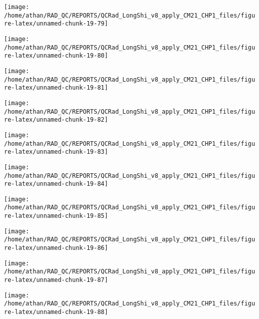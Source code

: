\documentclass[
  10pt,
  a4paper,oneside]{article}
\begin{document}
\begin{center}\texttt{[image: /home/athan/RAD\_QC/REPORTS/QCRad\_LongShi\_v8\_apply\_CM21\_CHP1\_files/figure-latex/unnamed-chunk-19-79]} \end{center}

\begin{center}\texttt{[image: /home/athan/RAD\_QC/REPORTS/QCRad\_LongShi\_v8\_apply\_CM21\_CHP1\_files/figure-latex/unnamed-chunk-19-80]} \end{center}

\begin{center}\texttt{[image: /home/athan/RAD\_QC/REPORTS/QCRad\_LongShi\_v8\_apply\_CM21\_CHP1\_files/figure-latex/unnamed-chunk-19-81]} \end{center}

\begin{center}\texttt{[image: /home/athan/RAD\_QC/REPORTS/QCRad\_LongShi\_v8\_apply\_CM21\_CHP1\_files/figure-latex/unnamed-chunk-19-82]} \end{center}

\begin{center}\texttt{[image: /home/athan/RAD\_QC/REPORTS/QCRad\_LongShi\_v8\_apply\_CM21\_CHP1\_files/figure-latex/unnamed-chunk-19-83]} \end{center}

\begin{center}\texttt{[image: /home/athan/RAD\_QC/REPORTS/QCRad\_LongShi\_v8\_apply\_CM21\_CHP1\_files/figure-latex/unnamed-chunk-19-84]} \end{center}

\begin{center}\texttt{[image: /home/athan/RAD\_QC/REPORTS/QCRad\_LongShi\_v8\_apply\_CM21\_CHP1\_files/figure-latex/unnamed-chunk-19-85]} \end{center}

\begin{center}\texttt{[image: /home/athan/RAD\_QC/REPORTS/QCRad\_LongShi\_v8\_apply\_CM21\_CHP1\_files/figure-latex/unnamed-chunk-19-86]} \end{center}

\begin{center}\texttt{[image: /home/athan/RAD\_QC/REPORTS/QCRad\_LongShi\_v8\_apply\_CM21\_CHP1\_files/figure-latex/unnamed-chunk-19-87]} \end{center}

\begin{center}\texttt{[image: /home/athan/RAD\_QC/REPORTS/QCRad\_LongShi\_v8\_apply\_CM21\_CHP1\_files/figure-latex/unnamed-chunk-19-88]} \end{center}
\end{document}
